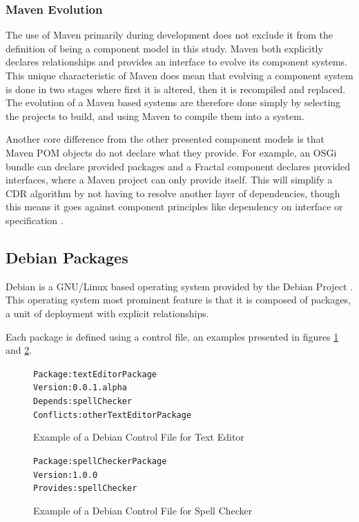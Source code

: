 \subsubsection{Maven Evolution}
The use of Maven primarily during development does not exclude it from the definition of being a component model in this study.
Maven both explicitly declares relationships and provides an interface to evolve its component systems. 
This unique characteristic of Maven does mean that evolving a component system is done in two stages where first it is altered, then it is recompiled and replaced.
The evolution of a Maven based systems are therefore done simply by selecting the projects to build, and using Maven to compile them into a system. 

Another core difference from the other presented component models is that Maven POM objects do not declare what they provide.
For example, an OSGi bundle can declare provided packages and a Fractal component declares provided interfaces, where a Maven project can only provide itself.
This will simplify a CDR algorithm by not having to resolve another layer of dependencies, 
though this means it goes against component principles like dependency on interface or specification \citep{Szyperski2002}.

\subsection{Debian Packages}
Debian is a GNU/Linux based operating system provided by the Debian Project \citep{Barth2005}.
This operating system most prominent feature is that it is composed of packages, a unit of deployment with explicit relationships.

Each package is defined using a control file, an examples presented in figures \ref{debianmetadatate} and \ref{debianmetadatasc}.

\begin{figure}[htp]
\begin{center}
\begin{alltt}
Package: textEditorPackage
Version: 0.0.1.alpha
Depends: spellChecker
Conflicts: otherTextEditorPackage
\end{alltt}
  \caption[Debian Control file for Text Editor]{Example of a Debian Control File for Text Editor}
  \label{debianmetadatate}
\end{center}
\end{figure}

\begin{figure}[htp]
\begin{center}
\begin{alltt}
Package: spellCheckerPackage
Version: 1.0.0
Provides: spellChecker
\end{alltt}
  \caption[Debian Control files for Spell Checker]{Example of a Debian Control File for Spell Checker}
  \label{debianmetadatasc}
\end{center}
\end{figure}

